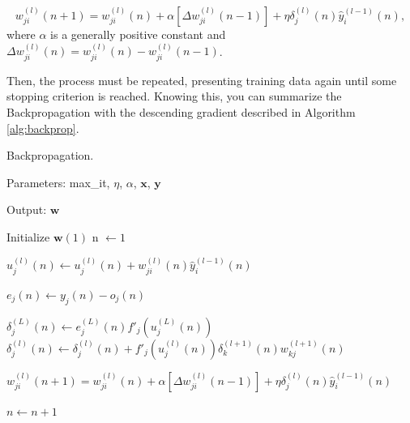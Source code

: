 \begin{equation}
\label{eq:backprop9}
    w_{ji}^{(l)} (n+1) = w_{ji}^{(l)}(n) + \alpha[\Delta w_{ji}^{(l)}(n-1)] + \eta \delta_j^{(l)}(n) \hat{y}_i^{(l-1)} (n),
\end{equation}
where $\alpha$ is a generally positive constant and $\Delta w_{ji}^{(l)}(n) = w_{ji}^{(l)}(n) - w_{ji}^{(l)}(n-1)$.

Then, the process must be repeated, presenting training data again until some stopping criterion is reached. Knowing this, you can summarize the Backpropagation with the descending gradient described in Algorithm \ref{alg:backprop}.


\begin{algorithm}[h!]
    \caption{Backpropagation. \label{alg:backprop}}
    
    Parameters: max\_it, $\eta$, $\alpha$, $\mathbf{x}$, $\mathbf{y}$
    
    Output: $\mathbf{w}$
    
    \begin{algorithmic}[1] 
        \STATE Initialize $\mathbf{w}(1)$
        \STATE n $\leftarrow 1$


                
                        \STATE $u_j^{(l)}(n) \leftarrow u_j^{(l)}(n) + w_{ji}^{(l)}(n) \hat{y}_i^{(l-1)}(n)$ 
                    \ENDFOR

                    \STATE $e_j (n) \leftarrow y_j(n) - o_j (n)$ 
                \ENDFOR
            
            \ENDFOR

                        \STATE $ \delta_j^{(L)} (n) \leftarrow e_j^{(L)}(n) {f}'_j (u_j^{(L)}(n)) $ 
                    \ELSE
                            \STATE $ \delta_j^{(l)} (n) \leftarrow \delta_j^{(l)} (n) + {f}'_j (u_j^{(l)}(n)) \delta_k^{(l+1)} (n) w_{kj}^{(l+1)}(n) $ 
                        \ENDFOR
                    \ENDIF

                        \STATE $w_{ji}^{(l)} (n+1) = w_{ji}^{(l)}(n) + \alpha[\Delta w_{ji}^{(l)}(n-1)] + \eta \delta_j^{(l)}(n) \hat{y}_i^{(l-1)} (n)$ 
                    \ENDFOR
                \ENDFOR

            \ENDFOR

            \STATE $n \leftarrow n + 1 $

        \ENDWHILE
    \end{algorithmic}
\end{algorithm}


